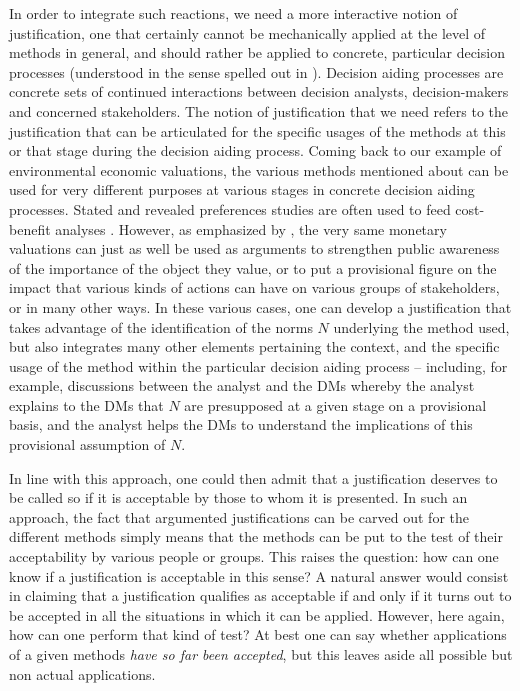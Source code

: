\documentclass[preprint, french, english, 11pt, authoryear]{elsarticle}%
\begin{document}
In order to integrate such reactions, we need a more interactive notion of justification, one that certainly cannot be mechanically applied at the level of methods in general, and should rather be applied to concrete, particular decision processes (understood in the sense spelled out in \citet{tsoukias_concept_2007}). Decision aiding processes are concrete sets of continued interactions between decision analysts, decision-makers and concerned stakeholders. The notion of justification that we need refers to the justification that can be articulated for the specific usages of the methods at this or that stage during the decision aiding process. Coming back to our example of environmental economic valuations, the various methods mentioned about can be used for very different purposes at various stages in concrete decision aiding processes. Stated and revealed preferences studies are often used to feed cost-benefit analyses \citep{layard_cost-benefit_1994}. However, as emphasized by \citet{meinard_ethical_2016}, the very same monetary valuations can just as well be used as arguments to strengthen public awareness of the importance of the object they value, or to put a provisional figure on the impact that various kinds of actions can have on various groups of stakeholders, or in many other ways. In these various cases, one can develop a justification that takes advantage of the identification of the norms $N$ underlying the method used, but also integrates many other elements pertaining the context, and the specific usage of the method within the particular decision aiding process -- including, for example, discussions between the analyst and the \acp{DM} whereby the analyst explains to the \acp{DM} that $N$ are presupposed at a given stage on a provisional basis, and the analyst helps the \acp{DM} to understand the implications of this provisional assumption of $N$.

In line with this approach, one could then admit that a justification deserves to be called so if it is acceptable by those to whom it is presented. In such an approach, the fact that argumented justifications can be carved out for the different methods simply means that the methods can be put to the test of their acceptability by various people or groups. This raises the question: how can one know if a justification is acceptable in this sense? A natural answer would consist in claiming that a justification qualifies as acceptable if and only if it turns out to be accepted in all the situations in which it can be applied. However, here again, how can one perform that kind of test? At best one can say whether applications of a given methods \emph{have so far been accepted}, but this leaves aside all possible but non actual applications.
\end{document}
